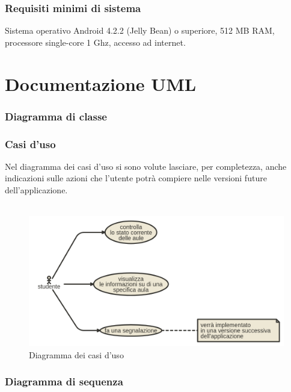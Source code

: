 \documentclass{article}
\begin{document}
	\section{Requisiti minimi di sistema}
	Sistema operativo Android 4.2.2 (Jelly Bean) o superiore, 512 MB RAM, processore single-core 1 Ghz, accesso ad internet.
	\newpage
	\part{Documentazione UML}
	\section{Diagramma di classe}
	\newpage
	\section{Casi d'uso}
	Nel diagramma dei casi d'uso si sono volute lasciare, per completezza, anche indicazioni sulle azioni che l'utente potrà compiere nelle versioni future dell'applicazione.\\\\
	\begin{figure}[h]
		\includegraphics[width=\textwidth]{casiduso}
		\centering
		\caption{Diagramma dei casi d'uso}
	\end{figure}
	\newpage
	\section{Diagramma di sequenza}
	\newpage
\end{document}
